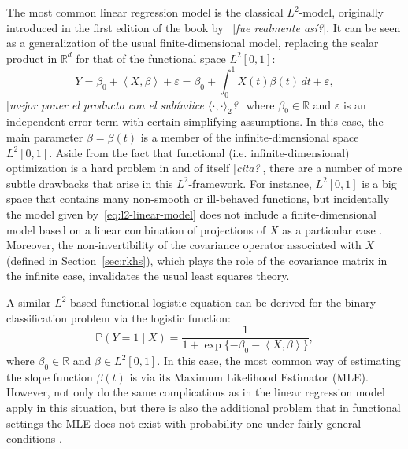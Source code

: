 \documentclass[ba]{imsart}
\numberwithin{equation}{section}
\theoremstyle{plain}
\renewcommand{\epsilon}{\varepsilon}
\newcommand{\R}{\mathbb{R}}
\newcommand\dotprod[2]{\left\langle #1, #2 \right\rangle}
\newcommand\incomment[1]{\color{red}[\textit{#1}]\color{black}}
\begin{document}
The most common linear regression model is the classical \(L^2\)-model, originally introduced in the first edition of the book by~\citet{ramsay2005functional} \incomment{fue realmente así?}. It can be seen as a generalization of the usual finite-dimensional model, replacing the scalar product in \(\R^d\) for that of the functional space \(L^2[0,1]\):
\begin{equation}\label{eq:l2-linear-model}
Y = \beta_0 + \dotprod{X}{\beta} + \epsilon = \beta_0 + \int_0^1 X(t)\beta(t)\, dt + \epsilon,
\end{equation}
\incomment{mejor poner el producto con el subíndice \(\langle \cdot , \cdot \rangle_2\)?}~where \(\beta_0\in \R\) and \(\epsilon\) is an independent error term with certain simplifying assumptions. In this case, the main parameter \(\beta=\beta(t)\) is a member of the infinite-dimensional space \(L^2[0, 1]\). Aside from the fact that functional (i.e. infinite-dimensional) optimization is a hard problem in and of itself \incomment{cita?}, there are a number of more subtle drawbacks that arise in this \(L^2\)-framework. For instance, \(L^2[0, 1]\) is a big space that contains many non-smooth or ill-behaved functions, but incidentally the model given by~\eqref{eq:l2-linear-model} does not include a finite-dimensional model based on a linear combination of projections of \(X\) as a particular case \citep[see][]{berrendero2019rkhs}. Moreover, the non-invertibility of the covariance operator associated with \(X\) (defined in Section~\ref{sec:rkhs}), which plays the role of the covariance matrix in the infinite case, invalidates the usual least squares theory.

A similar \(L^2\)-based functional logistic equation can be derived for the binary classification problem via the logistic function:
\begin{equation}\label{eq:l2-logistic-model}
  \mathbb P(Y=1 \mid X) = \frac{1}{1 + \exp\{-\beta_0 - \dotprod{X}{\beta}\}},
\end{equation}
where \(\beta_0 \in \R\) and \(\beta \in L^2[0, 1]\). In this case, the most common way of estimating the slope function \(\beta(t)\) is via its Maximum Likelihood Estimator (MLE). However, not only do the same complications as in the linear regression model apply in this situation, but there is also the additional problem that in functional settings the MLE does not exist with probability one under fairly general conditions \citep[see][Sec.~3.2]{buenolarraz2021functional}.
\end{document}
